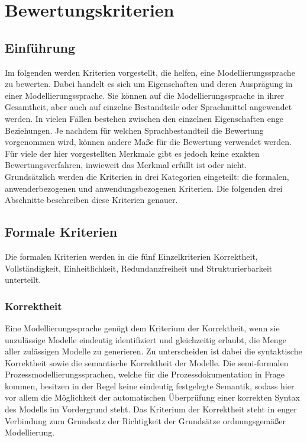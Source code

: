 

\chapter{Bewertungskriterien}
\label{ch:Bewertungskriterien}
\section{Einführung}
Im folgenden werden Kriterien vorgestellt, die helfen, eine Modellierungssprache zu bewerten. Dabei
handelt es sich um Eigenschaften und deren Ausprägung in einer Modellierungssprache. Sie können
auf die Modellierungssprache in ihrer Gesamtheit, aber auch auf einzelne Bestandteile oder Sprachmittel
angewendet werden. In vielen Fällen bestehen zwischen den einzelnen Eigenschaften enge Beziehungen.
Je nachdem für welchen Sprachbestandteil die Bewertung vorgenommen wird, können andere
Maße für die Bewertung verwendet werden. Für viele der hier vorgestellten Merkmale gibt es jedoch
keine exakten Bewertungsverfahren, inwieweit das Merkmal erfüllt ist oder nicht.\\
Grundsätzlich werden die Kriterien in drei Kategorien eingeteilt: die formalen, anwenderbezogenen und anwendungsbezogenen Kriterien.
Die folgenden drei Abschnitte beschreiben diese Kriterien genauer.


\section{Formale Kriterien}  
Die formalen Kriterien werden in die fünf Einzelkriterien Korrektheit, Vollständigkeit, Einheitlichkeit, Redundanzfreiheit und Strukturierbarkeit unterteilt.
\subsection{Korrektheit}
Eine Modellierungssprache genügt dem Kriterium der Korrektheit, wenn sie unzulässige Modelle eindeutig identifiziert und gleichzeitig erlaubt, die Menge aller zulässigen Modelle zu generieren. Zu unterscheiden ist dabei die syntaktische Korrektheit sowie die semantische Korrektheit der Modelle. Die semi-formalen Prozessmodellierungssprachen, welche für die Prozessdokumentation in Frage kommen, besitzen in der Regel keine eindeutig festgelegte Semantik, sodass hier vor allem die Möglichkeit der automatischen Überprüfung einer korrekten Syntax des Modells im Vordergrund steht. Das Kriterium der Korrektheit steht in enger Verbindung zum Grundsatz der Richtigkeit der Grundsätze ordnungsgemäßer Modellierung.
